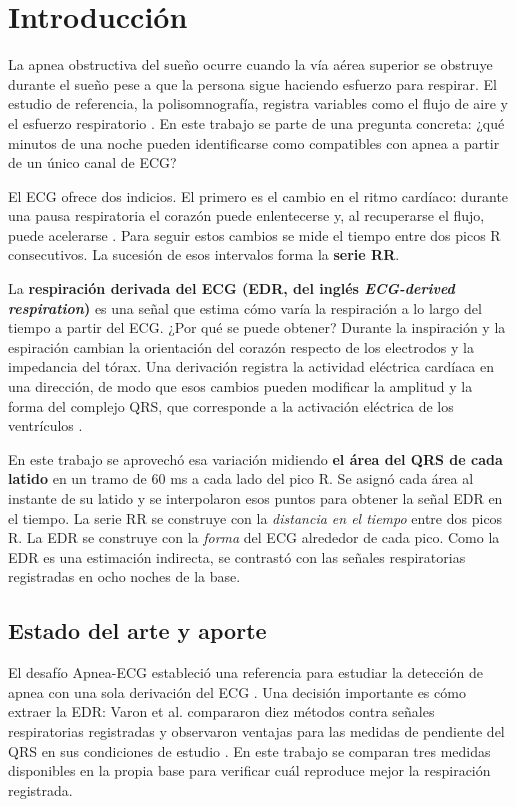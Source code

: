 \documentclass[10pt,a4paper]{article}
\begin{document}
\section{Introducción}
La apnea obstructiva del sueño ocurre cuando la vía aérea superior se obstruye durante el sueño pese a que la persona sigue haciendo esfuerzo para respirar. El estudio de referencia, la polisomnografía, registra variables como el flujo de aire y el esfuerzo respiratorio \cite{kapur}. En este trabajo se parte de una pregunta concreta: ¿qué minutos de una noche pueden identificarse como compatibles con apnea a partir de un único canal de ECG?

El ECG ofrece dos indicios. El primero es el cambio en el ritmo cardíaco: durante una pausa respiratoria el corazón puede enlentecerse y, al recuperarse el flujo, puede acelerarse \cite{guilleminault}. Para seguir estos cambios se mide el tiempo entre dos picos R consecutivos. La sucesión de esos intervalos forma la \textbf{serie RR}.

La \textbf{respiración derivada del ECG (EDR, del inglés \emph{ECG-derived respiration})} es una señal que estima cómo varía la respiración a lo largo del tiempo a partir del ECG. ¿Por qué se puede obtener? Durante la inspiración y la espiración cambian la orientación del corazón respecto de los electrodos y la impedancia del tórax. Una derivación registra la actividad eléctrica cardíaca en una dirección, de modo que esos cambios pueden modificar la amplitud y la forma del complejo QRS, que corresponde a la activación eléctrica de los ventrículos \cite{charlton,varon}.

En este trabajo se aprovechó esa variación midiendo \textbf{el área del QRS de cada latido} en un tramo de 60 ms a cada lado del pico R. Se asignó cada área al instante de su latido y se interpolaron esos puntos para obtener la señal EDR en el tiempo. La serie RR se construye con la \emph{distancia en el tiempo} entre dos picos R. La EDR se construye con la \emph{forma} del ECG alrededor de cada pico. Como la EDR es una estimación indirecta, se contrastó con las señales respiratorias registradas en ocho noches de la base.

\subsection{Estado del arte y aporte}
El desafío Apnea-ECG estableció una referencia para estudiar la detección de apnea con una sola derivación del ECG \cite{physionet,dechazal}. Una decisión importante es cómo extraer la EDR: Varon et al. compararon diez métodos contra señales respiratorias registradas y observaron ventajas para las medidas de pendiente del QRS en sus condiciones de estudio \cite{varon}. En este trabajo se comparan tres medidas disponibles en la propia base para verificar cuál reproduce mejor la respiración registrada.
\end{document}
